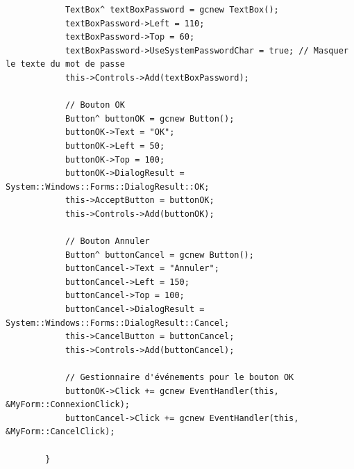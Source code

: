 \documentclass[main.tex]{subfiles}
\begin{document}
\begin{lstlisting}
			TextBox^ textBoxPassword = gcnew TextBox();
			textBoxPassword->Left = 110;
			textBoxPassword->Top = 60;
			textBoxPassword->UseSystemPasswordChar = true; // Masquer le texte du mot de passe
			this->Controls->Add(textBoxPassword);

			// Bouton OK
			Button^ buttonOK = gcnew Button();
			buttonOK->Text = "OK";
			buttonOK->Left = 50;
			buttonOK->Top = 100;
			buttonOK->DialogResult = System::Windows::Forms::DialogResult::OK;
			this->AcceptButton = buttonOK;
			this->Controls->Add(buttonOK);

			// Bouton Annuler
			Button^ buttonCancel = gcnew Button();
			buttonCancel->Text = "Annuler";
			buttonCancel->Left = 150;
			buttonCancel->Top = 100;
			buttonCancel->DialogResult = System::Windows::Forms::DialogResult::Cancel;
			this->CancelButton = buttonCancel;
			this->Controls->Add(buttonCancel);

			// Gestionnaire d'événements pour le bouton OK
			buttonOK->Click += gcnew EventHandler(this, &MyForm::ConnexionClick);
			buttonCancel->Click += gcnew EventHandler(this, &MyForm::CancelClick);

		}


\end{lstlisting}
\end{document}
